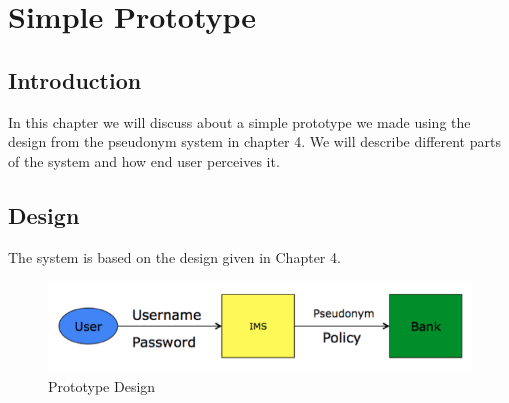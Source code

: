 \chapter{Simple Prototype}
\section{Introduction}
In this chapter we will discuss about a simple prototype we made using the design from the pseudonym system in chapter 4. We will describe different parts of the system and how end user perceives it.
\section{Design}
The system is based on the design given in Chapter 4. 
\begin{figure}[h]
	\centering
	\includegraphics[width=\textwidth]{figures/Pseudonym}
	\caption{Prototype Design}
	\label{fig:Pseudonym}
\end{figure}